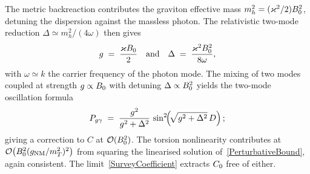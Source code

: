 The metric backreaction contributes the graviton effective mass
$m_h^2 = (\varkappa^2/2)B_0^2$, detuning the dispersion against
the massless photon. The relativistic two-mode reduction
$\Delta \simeq m_h^2/(4\omega)$ then gives
\begin{align*}
  g \;=\; \frac{\varkappa B_0}{2}
  \quad\text{and}\quad
  \Delta \;=\; \frac{\varkappa^2 B_0^2}{8\omega} ,
\end{align*}
with $\omega \simeq k$ the carrier frequency of the photon mode.
The mixing of two modes coupled at strength $g\propto B_0$ with
detuning $\Delta\propto B_0^2$ yields the two-mode oscillation
formula~\cite{raffelt1988mixing}
\begin{align*}
  P_{g\gamma} \;=\; \frac{g^2}{g^2+\Delta^2}
  \,\sin^2\!\!\left(\!\sqrt{g^2+\Delta^2}\,D\right) ;
\end{align*}
giving a correction to $C$ at $\mathcal{O}(B_0^2)$.
The torsion nonlinearity contributes at
$\mathcal{O}\!\left(B_0^2(g_{\mathrm{NM}}/m_T^2)^2\right)$ from
squaring the linearised solution of~\cref{PerturbativeBound},
again consistent.
The limit~\cref{SurveyCoefficient} extracts $C_0$ free of either.

